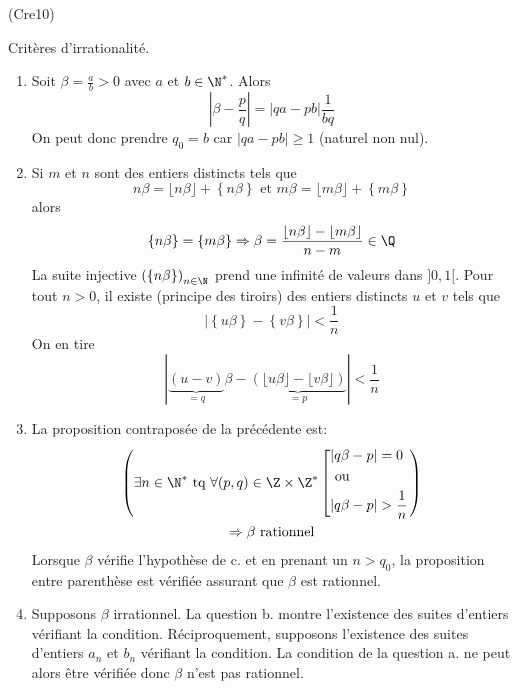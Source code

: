 \begin{tiny}(Cre10)\end{tiny} Critères d'irrationalité.
\begin{enumerate}
  \item Soit $\beta= \frac{a}{b}>0$ avec $a$ et $b\in\N^*$. Alors
\begin{displaymath}
  \left| \beta - \frac{p}{q}\right| = |qa - pb|\frac{1}{bq}
\end{displaymath}
On peut donc prendre $q_0=b$ car $|qa-pb|\geq1$ (naturel non nul).

  \item Si $m$ et $n$ sont des entiers distincts tels que
\begin{displaymath}
n\beta = \lfloor n\beta\rfloor + \left\lbrace n\beta \right\rbrace  \text{ et }
m\beta = \lfloor m\beta\rfloor + \left\lbrace m\beta \right\rbrace
\end{displaymath}
alors
\begin{displaymath}
\left\lbrace n\beta \right\rbrace = \left\lbrace m\beta \right\rbrace \Rightarrow
\beta = \frac{\lfloor n\beta\rfloor - \lfloor m\beta\rfloor}{n-m} \in \Q
\end{displaymath}
La suite injective $\left( \left\lbrace n\beta \right\rbrace\right)_{n\in \N}$ prend une infinité de valeurs dans $]0,1[$. Pour tout $n>0$, il existe (principe des tiroirs) des entiers distincts $u$ et $v$ tels que 
\begin{displaymath}
  \left|\left\lbrace u\beta \right\rbrace - \left\lbrace v\beta \right\rbrace \right| < \frac{1}{n}
\end{displaymath}
On en tire
\begin{displaymath}
  \left|\underset{=q}{\underbrace{(u-v)}}\beta - 
  \underset{=p}{\underbrace{\left( \lfloor u\beta\rfloor  - \lfloor v\beta\rfloor \right)}}  \right| < \frac{1}{n}
\end{displaymath}

  \item La proposition contraposée de la précédente est:
\begin{multline*}
\left( \exists n \in \N^* \text{ tq }\forall (p,q)\in \Z\times \Z^*
\left[ 
\begin{aligned}
  &|q\beta -p| = 0 \\ &\text{ ou } \\ &|q\beta -p|>\frac{1}{n}
\end{aligned}
\right. \right) \\
\Rightarrow   \beta \text{ rationnel}
\end{multline*}
Lorsque $\beta$ vérifie l'hypothèse de c. et en prenant un $n>q_0$, la proposition entre parenthèse est vérifiée assurant que $\beta$ est rationnel.
  
  \item Supposons $\beta$ irrationnel. La question b. montre l'existence des suites d'entiers vérifiant la condition.\newline
Réciproquement, supposons l'existence des suites d'entiers $a_n$ et $b_n$ vérifiant la condition. La condition de la question a. ne peut alors être vérifiée donc $\beta$ n'est pas rationnel.
\end{enumerate}
